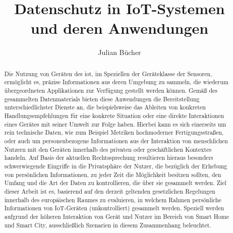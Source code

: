 \documentclass[
runningheads,
]{llncs}
\begin{document}

\title{Datenschutz in IoT-Systemen \\und deren Anwendungen}
%
%
\author{Julian Bücher}
%
%
%
\maketitle              %


\begin{abstract}
Die Nutzung von Geräten des \ac{iot}, im Speziellen der Geräteklasse der Sensoren, ermöglicht es, präzise Informationen aus deren Umgebung zu sammeln, die wiederum übergeordneten Applikationen zur Verfügung gestellt werden können. 
Gemäß des gesammelten Datenmaterials bieten diese Anwendungen die Bereitstellung unterschiedlichster Dienste an, die beispielsweise das Ableiten von konkreten Handlungsempfehlungen für eine konkrete Situation oder eine direkte Interaktionen eines Gerätes mit seiner Umwelt zur Folge haben. 
Hierbei kann es sich einerseits um rein technische Daten, wie zum Beispiel Metriken hochmoderner Fertigungsstraßen, oder auch um personenbezogene Informationen aus der Interaktion von menschlichen Nutzern mit den Geräten innerhalb des privaten oder geschäftlichen Kontextes handeln. 
Auf Basis der aktuellen Rechtssprechung resultieren hieraus besonders schwerwiegende Eingriffe in die Privatsphäre der Nutzer, die bezüglich der Erhebung von persönlichen Informationen, zu jeder Zeit die Möglichkeit besitzen sollten, den Umfang und die Art der Daten zu kontrollieren, die über sie gesammelt werden.
Ziel dieser Arbeit ist es, basierend auf den derzeit geltenden gesetzlichen Regelungen innerhalb des europäischen Raumes zu evaluieren, in welchem Rahmen persönliche Informationen von IoT-Geräten (unkontrolliert) gesammelt werden.
Speziell werden aufgrund der höheren Interaktion von Gerät und Nutzer im Bereich von Smart Home und Smart City, ausschließlich Szenarien in diesem Zusammenhang beleuchtet.

\end{abstract}
\end{document}
